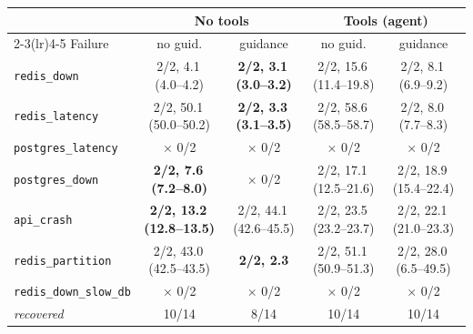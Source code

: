 \begin{tabular}{@{}lcccc@{}}
\toprule
 & \multicolumn{2}{c}{No tools} & \multicolumn{2}{c}{Tools (agent)} \\
\cmidrule(lr){2-3}\cmidrule(lr){4-5}
Failure & no guid. & guidance & no guid. & guidance \\
\midrule
\texttt{redis\_down} & 2/2, 4.1\,{\scriptsize(4.0--4.2)} & \textbf{2/2, 3.1\,{\scriptsize(3.0--3.2)}} & 2/2, 15.6\,{\scriptsize(11.4--19.8)} & 2/2, 8.1\,{\scriptsize(6.9--9.2)} \\
\texttt{redis\_latency} & 2/2, 50.1\,{\scriptsize(50.0--50.2)} & \textbf{2/2, 3.3\,{\scriptsize(3.1--3.5)}} & 2/2, 58.6\,{\scriptsize(58.5--58.7)} & 2/2, 8.0\,{\scriptsize(7.7--8.3)} \\
\texttt{postgres\_latency} & $\times$ 0/2 & $\times$ 0/2 & $\times$ 0/2 & $\times$ 0/2 \\
\texttt{postgres\_down} & \textbf{2/2, 7.6\,{\scriptsize(7.2--8.0)}} & $\times$ 0/2 & 2/2, 17.1\,{\scriptsize(12.5--21.6)} & 2/2, 18.9\,{\scriptsize(15.4--22.4)} \\
\texttt{api\_crash} & \textbf{2/2, 13.2\,{\scriptsize(12.8--13.5)}} & 2/2, 44.1\,{\scriptsize(42.6--45.5)} & 2/2, 23.5\,{\scriptsize(23.2--23.7)} & 2/2, 22.1\,{\scriptsize(21.0--23.3)} \\
\midrule
\texttt{redis\_partition} & 2/2, 43.0\,{\scriptsize(42.5--43.5)} & \textbf{2/2, 2.3} & 2/2, 51.1\,{\scriptsize(50.9--51.3)} & 2/2, 28.0\,{\scriptsize(6.5--49.5)} \\
\texttt{redis\_down\_slow\_db} & $\times$ 0/2 & $\times$ 0/2 & $\times$ 0/2 & $\times$ 0/2 \\
\midrule
\textit{recovered} & 10/14 & 8/14 & 10/14 & 10/14 \\
\bottomrule
\end{tabular}
